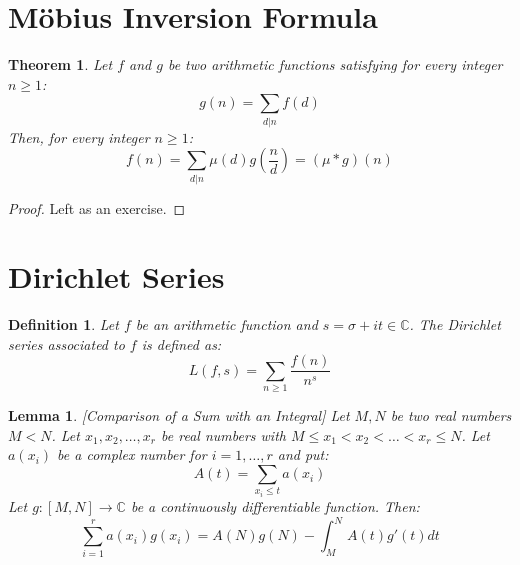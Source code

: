 \documentclass[12pt]{article}
\title{}
\author{}
\date{}
\newtheorem{thm}{Theorem}
\newtheorem{lemma}{Lemma}
\newtheorem{defn}{Definition}
\begin{document}
\section{Möbius Inversion Formula}

\begin{thm}
Let $f$ and $g$ be two arithmetic functions satisfying for every integer $n \ge 1$:
\[ g(n) = \sum_{d|n} f(d) \]
Then, for every integer $n \ge 1$:
\[ f(n) = \sum_{d|n} \mu(d) g\left(\frac{n}{d}\right) = (\mu * g)(n) \]
\end{thm}

\begin{proof}
	Left as an exercise.
\end{proof}

\section{Dirichlet Series}

\begin{defn}
	Let $f$ be an arithmetic function and $s = \sigma + it \in \mathbb{C}$. The Dirichlet series associated to $f$ is defined as:
$$
L(f,s) = \sum_{n \ge 1} \frac{f(n)}{n^s}
$$
\end{defn}

\begin{lemma}\label{sum:int}[Comparison of a Sum with an Integral]
Let $M, N$ be two real numbers $M < N$. Let $x_1, x_2, \dots, x_r$ be real numbers with $M \le x_1 < x_2 < \dots < x_r \le N$. Let $a(x_i)$ be a complex number for $i=1, \dots, r$ and put:
\[ A(t) = \sum_{x_i \le t} a(x_i) \]
Let $g: [M, N] \to \mathbb{C}$ be a continuously differentiable function. Then:
\[ \sum_{i=1}^{r} a(x_i)g(x_i) = A(N)g(N) - \int_{M}^{N} A(t)g'(t)dt \]
\end{lemma}
\end{document}
